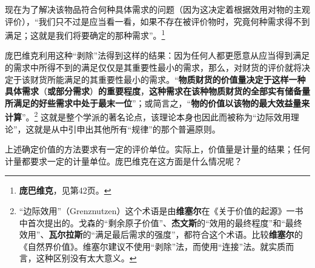 \documentclass[fontset=fandol, a4paper, 12pt, openright]{ctexbook}
\begin{document}
现在为了解决该物品符合何种具体需求的问题（因为这决定着根据效用对物的主观评价），“我们只不过是应当看一看，如果不存在被评价物时，究竟何种需求得不到满足；这就是我们将要确定的那种需求”。\footnote{\textbf{庞巴维克}，见第42页。}

庞巴维克利用这种“剥除”法得到这样的结果：因为任何人都更愿意从应当得到满足的需求中所得不到的满足仅仅是其重要性最小的需求，那么，对财货的评价就将决定于该财货所能满足的其重要性最小的需求。“\textbf{物质财货的价值量决定于这样一种具体需求}（\textbf{或部分需求}）\textbf{的重要程度}，\textbf{这种需求在该种物质财货的全部实有储备量所满足的好些需求中处于最末一位}”；或简言之，“\textbf{物的价值以该物的最大效益量来计算}”。\footnote{“边际效用”（Grenznutzen）这个术语是由\textbf{维塞尔}在《关于价值的起源》一书中首次提出的。戈森的“剩余原子价值”、\textbf{杰文斯}的“效用的最终程度”和“最终效用”、\textbf{瓦尔拉斯}的“满足最后需求的强度”，都符合这个术语。比较\textbf{维塞尔}的《自然界价值》。维塞尔建议不使用“剥除”法，而使用“连接”法。就实质而言，这种区别没有太大意义。} 这就是整个学派的著名论点，该理论本身也因此而被称为“边际效用理论”，这就是从中引申出其他所有“规律”的那个普遍原则。

上述确定价值的方法要求有一定的评价单位。实际上，价值量是计量的结果；任何计量都要求一定的计量单位。庞巴维克在这方面是什么情况呢？
\end{document}
